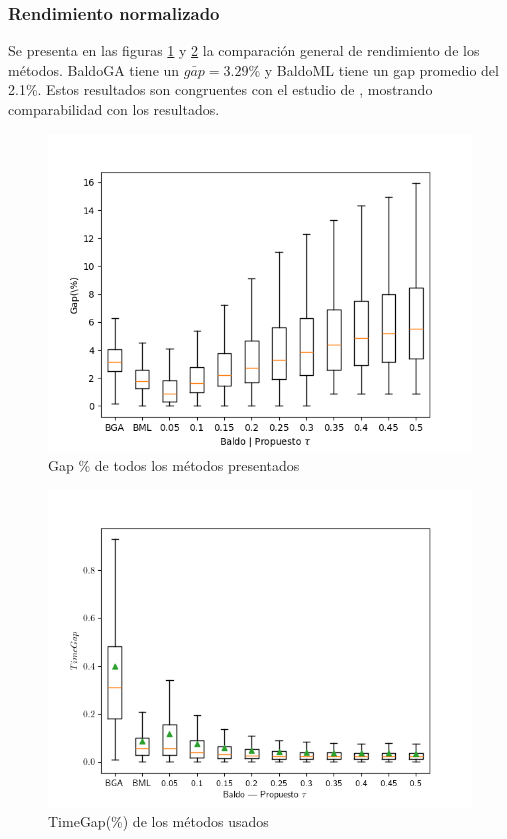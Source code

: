 \documentclass[spanish, a4paper, 12pt, openany,final]{book}
\begin{document}
\subsubsection*{Rendimiento normalizado}

Se presenta en las figuras \ref{fig:full_gap} y \ref{fig:full_timegap} la comparación general de rendimiento de los métodos. BaldoGA tiene un $\bar{gap} = 3.29\%$ y BaldoML tiene un gap promedio del 2.1\%. Estos resultados son congruentes con el estudio de \cite{baldo_polynomial_2023}, mostrando comparabilidad con los resultados.


\begin{figure}[H]
	\centering
	\includegraphics[scale=0.7]{graphs/full_gap_comparison.png}
	\caption{Gap \% de todos los métodos presentados}
	\label{fig:full_gap}
\end{figure}

\begin{figure}[H]
	\centering
	\includegraphics[scale=0.7]{graphs/full_timegap_comparison.png}
	\caption{TimeGap(\%) de los métodos usados}
	\label{fig:full_timegap}
\end{figure}
\end{document}
